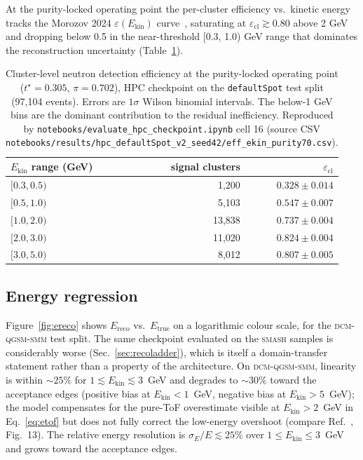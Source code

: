 \documentclass[aps,prc,twocolumn,superscriptaddress,showpacs,%
               nofootinbib,floatfix,longbibliography]{revtex4-2}
\newcommand{\Ekin}{E_{\text{kin}}}
\newcommand{\SMASH}{\textsc{smash}}
\newcommand{\DCM}{\textsc{dcm-qgsm-smm}}
\begin{document}
At the purity-locked operating point the per-cluster efficiency vs.\
kinetic energy tracks the Morozov 2024
$\varepsilon(\Ekin)$ curve~\cite{Morozov2024HGND}, saturating
at $\varepsilon_{\text{cl}} \gtrsim 0.80$ above 2 GeV and dropping
below 0.5 in the near-threshold [0.3, 1.0) GeV range that dominates
the reconstruction uncertainty (Table~\ref{tab:eff_ekin}).

\begin{table}[!t]
  \centering
  \caption{Cluster-level neutron detection efficiency at the
    purity-locked operating point ($t^\star = 0.305$, $\pi = 0.702$),
    HPC checkpoint on the \texttt{defaultSpot} test split (97{,}104
    events). Errors are $1\sigma$ Wilson binomial intervals. The
    below-1 GeV bins are the dominant contribution to the residual
    inefficiency. Reproduced by
    \texttt{notebooks/evaluate\_hpc\_checkpoint.ipynb} cell 16
    (source CSV
    \texttt{notebooks/results/hpc\_defaultSpot\_v2\_seed42/eff\_ekin\_purity70.csv}).}
  \label{tab:eff_ekin}
  \begin{tabular}{lrr}
    \toprule
    $\Ekin$ range (GeV) & signal clusters & $\varepsilon_{\text{cl}}$ \\
    \midrule
    $[0.3, 0.5)$ & 1{,}200  & $0.328 \pm 0.014$ \\
    $[0.5, 1.0)$ & 5{,}103  & $0.547 \pm 0.007$ \\
    $[1.0, 2.0)$ & 13{,}838 & $0.737 \pm 0.004$ \\
    $[2.0, 3.0)$ & 11{,}020 & $0.824 \pm 0.004$ \\
    $[3.0, 5.0)$ & 8{,}012  & $0.807 \pm 0.005$ \\
    \bottomrule
  \end{tabular}
\end{table}

\subsection{Energy regression}

Figure~\ref{fig:ereco} shows $E_{\text{reco}}$ vs.\ $E_{\text{true}}$
on a logarithmic colour scale, for the \DCM{} test split.  The same
checkpoint evaluated on the \SMASH{} samples is considerably worse
(Sec.~\ref{sec:recoladder}), which is itself a domain-transfer
statement rather than a property of the architecture.  On \DCM{},
linearity is within $\sim 25\%$ for
$1 \lesssim \Ekin \lesssim 3$~GeV and degrades to $\sim 30\%$
toward the acceptance edges (positive bias at $\Ekin < 1$~GeV,
negative bias at $\Ekin > 5$~GeV); the model compensates for the
pure-ToF overestimate visible at $\Ekin > 2$~GeV in
Eq.~\eqref{eq:etof} but does not fully correct the low-energy
overshoot (compare Ref.~\cite{Morozov2024HGND}, Fig.~13).  The
relative energy resolution is $\sigma_E/E \lesssim 25\%$ over
$1 \le \Ekin \le 3$~GeV and grows toward the acceptance edges.
\end{document}
